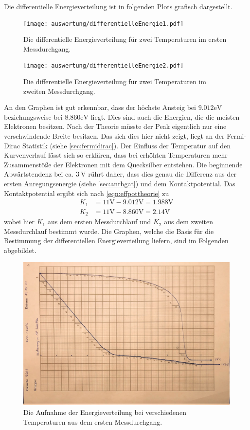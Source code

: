 Die differentielle Energieverteilung ist in folgenden Plots grafisch dargestellt.

\begin{figure}[H]
  \centering
  \texttt{[image: auswertung/differentielleEnergie1.pdf]}
  \caption{Die differentielle Energieverteilung für zwei Temperaturen im ersten Messdurchgang.}
  \label{fig:diffenergie1}
\end{figure}

\begin{figure}[H]
  \centering
  \texttt{[image: auswertung/differentielleEnergie2.pdf]}
  \caption{Die differentielle Energieverteilung für zwei Temperaturen im zweiten Messdurchgang.}
  \label{fig:diffenergie2}
\end{figure}
\noindent
An den Graphen ist gut erkennbar, dass der höchste Ansteig bei $9.012\si{\electronvolt}$
beziehungsweise bei $8.860\si{\electronvolt}$ liegt. Dies sind auch die Energien, die die meisten
Elektronen besitzen.
Nach der Theorie müsste der Peak eigentlich nur eine verschwindende Breite besitzen.
Das sich dies hier nicht zeigt, liegt an der Fermi-Dirac Statistik (siehe \ref{sec:fermidirac}).
Der Einfluss der Temperatur auf den Kurvenverlauf lässt sich so erklären, dass bei erhöhten
Temperaturen mehr Zusammenstöße der Elektronen mit dem Quecksilber entstehen.
Die beginnende Abwärtstendenz bei ca. $\SI{3}{\volt}$ rührt daher, dass dies genau die
Differenz aus der ersten Anregungsenergie (siehe \ref{sec:anrhgat}) und dem Kontaktpotential.
\noindent
Das Kontaktpotential ergibt sich nach \eqref{eqn:effpottheorie} zu
\begin{align}
  K_1  & = 11 \si{\volt} -  9.012 \si{\volt} = 1.988 \si{\volt} \\
  K_2  & = 11 \si{\volt} -  8.860 \si{\volt} = 2.14  \si{\volt}
  \label{eqn:kpotausw}
\end{align}
\noindent
wobei hier $K_1$ aus dem ersten Messdurchlauf und $K_2$ aus dem zweiten Messdurchlauf bestimmt wurde.
Die Graphen, welche die Basis für die Bestimmung der differentiellen Energieverteilung liefern, sind
im Folgenden abgebildet.
\begin{figure}[H]
  \centering
  \includegraphics[scale=0.25]{content/kurve1.jpeg}
  \caption{Die Aufnahme der Energieverteilung bei verschiedenen Temperaturen aus dem ersten Messdurchgang.}
  \label{fig:franckhertz1}
\end{figure}
